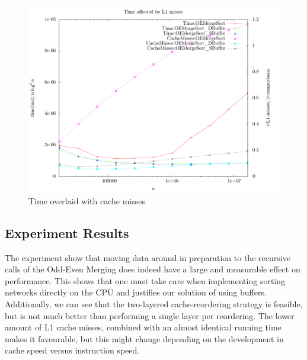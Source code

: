 \begin{figure}
\center
\includegraphics[width=\textwidth]{graphs/Buffer/tc2.pdf}
\caption{Time overlaid with cache misses}
\label{fig:Buffer:tc2}
\end{figure}


\subsection{Experiment Results}

The experiment show that moving data around in preparation to the recursive calls of the Odd-Even Merging does indeed have a large and measurable effect on performance. This shows that one must take care when implementing sorting networks directly on the CPU and justifies our solution of using buffers. 
Additionally, we can see that the two-layered cache-reordering strategy is feasible, but is not much better than performing a single layer per reordering. The lower amount of L1 cache misses, combined with an almost identical running time makes it favourable, but this might change depending on the development in cache speed versus instruction speed. 
